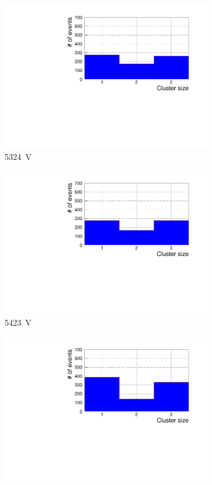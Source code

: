 \begin{figure}[H]
\begin{subfigure}{.33\linewidth}
			\includegraphics[width=1.1\linewidth]{fig/chapt6/Muon-ClS-1D-5200-gRPC-INFN.pdf}
			\caption{\label{fig:cluster-size-1D:C} \SI{5324}{V}}
		\end{subfigure}
		\begin{subfigure}{.33\linewidth}
		    \centering
			\includegraphics[width=1.1\linewidth]{fig/chapt6/Muon-ClS-1D-5300-gRPC-INFN.pdf}
			\caption{\label{fig:cluster-size-1D:D} \SI{5423}{V}}
		\end{subfigure}
		\begin{subfigure}{.33\linewidth}
		    \centering
			\includegraphics[width=1.1\linewidth]{fig/chapt6/Muon-ClS-1D-5400-gRPC-INFN.pdf}

\end{subfigure}
\end{figure}
